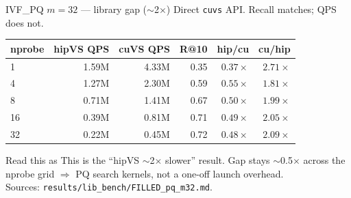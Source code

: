 \documentclass[aspectratio=169,11pt]{beamer}
\begin{document}
\begin{frame}{IVF\_PQ $m{=}32$ --- library gap ($\sim$2$\times$)}
  \footnotesize
  Direct \texttt{cuvs} API. Recall matches; QPS does not.\\[0.35em]

  \begin{center}
  \begin{tabular}{@{}lrrrrr@{}}
    \toprule
    \textbf{nprobe}
      & \textbf{hipVS QPS} & \textbf{cuVS QPS}
      & \textbf{R@10} & \textbf{hip/cu} & \textbf{cu/hip} \\
    \midrule
    1  & 1.59M & 4.33M & 0.35 & $0.37\times$ & $2.71\times$ \\
    4  & 1.27M & 2.30M & 0.59 & $0.55\times$ & $1.81\times$ \\
    8  & 0.71M & 1.41M & 0.67 & $0.50\times$ & $1.99\times$ \\
    16 & 0.39M & 0.81M & 0.71 & $0.49\times$ & $2.05\times$ \\
    32 & 0.22M & 0.45M & 0.72 & $0.48\times$ & $2.09\times$ \\
    \bottomrule
  \end{tabular}
  \end{center}

  \vspace{0.4em}
  \begin{block}{Read this as}
    \footnotesize
    This is the ``hipVS $\sim$2$\times$ slower'' result.
    Gap stays $\sim$0.5$\times$ across the nprobe grid $\Rightarrow$ PQ search kernels,
    not a one-off launch overhead.\\
    Sources: \texttt{results/lib\_bench/FILLED\_pq\_m32.md}.
  \end{block}
\end{frame}
\end{document}
